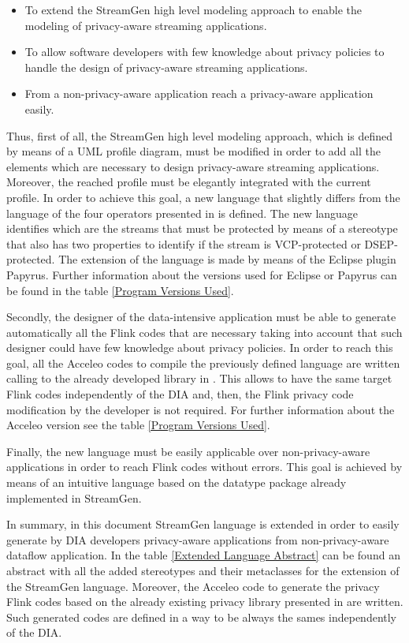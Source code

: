 \begin{itemize}
\item To extend the StreamGen high level modeling approach to enable the modeling of privacy-aware streaming applications.
\item To allow software developers with few knowledge about privacy policies to handle the design of privacy-aware streaming applications.
\item From a non-privacy-aware application reach a privacy-aware application easily.
\end{itemize}

Thus, first of all, the StreamGen high level modeling approach, which is defined by means of a UML profile diagram, must be modified in order to add all the elements which are necessary to design privacy-aware streaming applications. Moreover, the reached profile must be elegantly integrated with the current profile. In order to achieve this goal, a new language that slightly differs from the language of the four operators presented in \cite{privacypoliciesarticle} is defined. The new language identifies which are the streams that must be protected by means of a stereotype that also has two properties to identify if the stream is VCP-protected or DSEP-protected. The extension of the language is made by means of the Eclipse plugin Papyrus. Further information about the versions used for Eclipse or Papyrus can be found in the table \ref{Program Versions Used}.

Secondly, the designer of the data-intensive application must be able to generate automatically all the Flink codes that are necessary taking into account that such designer could have few knowledge about privacy policies. In order to reach this goal, all the Acceleo codes to compile the previously defined language are written calling to the already developed library in \cite{privacypoliciesarticle}. This allows to have the same target Flink codes independently of the DIA and, then, the Flink privacy code modification by the developer is not required. For further information about the Acceleo version see the table \ref{Program Versions Used}.

Finally, the new language must be easily applicable over non-privacy-aware applications in order to reach Flink codes without errors. This goal is achieved by means of an intuitive language based on the datatype package already implemented in StreamGen.

In summary, in this document StreamGen language is extended in order to easily generate by DIA developers privacy-aware applications from non-privacy-aware dataflow application. In the table \ref{Extended Language Abstract} can be found an abstract with all the added stereotypes and their metaclasses for the extension of the StreamGen language. Moreover, the Acceleo code to generate the privacy Flink codes based on the already existing privacy library presented in \cite{privacypoliciesarticle} are written. Such generated codes are defined in a way to be always the sames independently of the DIA.

